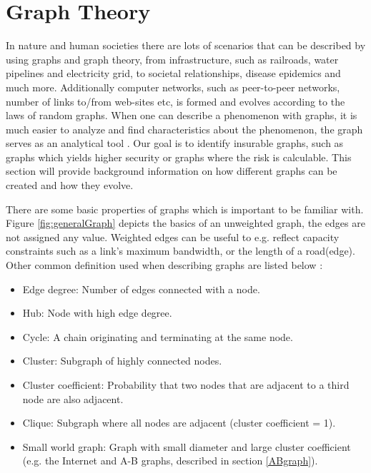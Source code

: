 \chapter{Graph Theory}
\label{chp:graphTheory} 

In nature and human societies there are lots of scenarios that can be described by using graphs and graph theory, from infrastructure, such as railroads, water pipelines and electricity grid, to societal relationships, disease epidemics and much more. Additionally computer networks, such as peer-to-peer networks,  number of links to/from web-sites etc, is formed and evolves according to the laws of random graphs. When one can describe a phenomenon with graphs, it is much easier to analyze and find characteristics about the phenomenon, the graph serves as an analytical tool \cite{audestad}. Our goal is to identify insurable graphs, such as graphs which yields higher security or graphs where the risk is calculable. This section will provide background information on how different graphs can be created and how they evolve.

There are some basic properties of graphs which is important to be familiar with. Figure \ref{fig:generalGraph} depicts the basics of an unweighted graph, the edges are not assigned any value. Weighted edges can be useful to e.g. reflect capacity constraints such as a link's maximum bandwidth, or the length of a road(edge). Other common definition used when describing graphs are listed below \cite{audestad}:
\begin{itemize}
\item Edge degree: Number of edges connected with a node.
\item Hub: Node with high edge degree.
\item Cycle: A chain originating and terminating at the same node.
\item Cluster: Subgraph of highly connected nodes.
\item Cluster coefficient: Probability that two nodes that are adjacent to a third node are also adjacent.
\item Clique: Subgraph where all nodes are adjacent (cluster coefficient = 1).
\item Small world graph: Graph with small diameter and large cluster coefficient (e.g. the Internet and A-B graphs, described in section \ref{ABgraph}).
\end{itemize}

